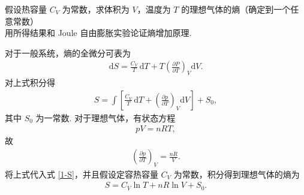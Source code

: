 \documentclass{assignment}
\begin{document}
\begin{prob}
    假设热容量 $C_V$ 为常数，求体积为 $V$，温度为 $T$ 的理想气体的熵（确定到一个任意常数）\\
    用所得结果和 Joule 自由膨胀实验论证熵增加原理.
\end{prob}
\begin{sol}
    对于一般系统，熵的全微分可表为
    \begin{align}
        \mathrm{d}S=\frac{C_V}{T}\,\mathrm{d}T+T\left(\frac{\partial P}{\partial T}\right)_V\mathrm{d}V.
    \end{align}
    对上式积分得
    \begin{align}
        \label{1-S}
        S=\int\left[\frac{C_V}{T}\,\mathrm{d}T+\left(\frac{\partial p}{\partial T}\right)_V\mathrm{d}V\right]+S_0,
    \end{align}
    其中 $S_0$ 为一常数.
    对于理想气体，有状态方程
    \begin{align}
        pV=nRT,
    \end{align}
    故
    \begin{align}
        \left(\frac{\partial p}{\partial T}\right)_V=\frac{nR}{V}.
    \end{align}
    将上式代入式 \eqref{1-S}，并且假设定容热容量 $C_V$ 为常数，积分得到理想气体的熵为
    \begin{align}
        S=C_V\ln T+nR\ln V+S_0.
    \end{align}
\end{sol}
\end{document}
